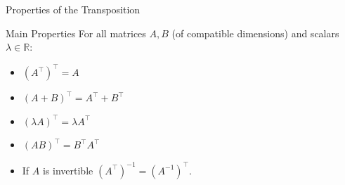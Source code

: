 \documentclass[aspectratio=169]{beamer}
\begin{document}
\begin{frame}{Properties of the Transposition}

\begin{alertblock}{Main Properties}
For all matrices $A,B$ (of compatible dimensions) and scalars $\lambda \in \mathbb{R}$:

\vspace{-2 mm}
\begin{itemize}
  \item $(A^\top)^\top = A$
\vspace{-1 mm}
  \item $(A + B)^\top = A^\top + B^\top$
\vspace{-1 mm}
  \item $(\lambda A)^\top = \lambda A^\top$
\vspace{-1 mm}
  \item $(AB)^\top = B^\top A^\top$
\vspace{-1 mm}
  \item If $A$ is invertible $
  (A^\top)^{-1} = (A^{-1})^\top. $
\end{itemize}
\end{alertblock}


\end{frame}
\end{document}
